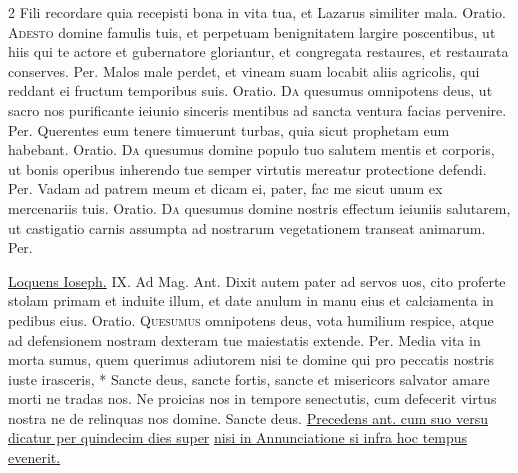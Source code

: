\begin{multicols*}{2}
 Fili recordare quia recepisti bona in vita tua, et Lazarus similiter mala. {\color{Red} Oratio.}
\lettrine[lines=2]{\zallmancaps \color{Blue} A}{desto} domine famulis tuis, et perpetuam benignitatem largire poscentibus, ut hiis qui te actore et gubernatore gloriantur, et congregata restaures, et restaurata conserves. Per.
 Malos male perdet, et vineam suam locabit aliis agricolis, qui reddant ei fructum temporibus suis. {\color{Red} Oratio.}
\lettrine[lines=2]{\zallmancaps \color{Red} D}{a} quesumus omnipotens deus, ut sacro nos purificante ieiunio sinceris mentibus ad sancta ventura facias pervenire. Per.
 Querentes eum tenere timuerunt turbas, quia sicut prophetam eum habebant. {\color{Red} Oratio.}
\lettrine[lines=2]{\zallmancaps \color{Blue} D}{a} quesumus domine populo tuo salutem mentis et corporis, ut bonis operibus inherendo tue semper virtutis mereatur protectione defendi. Per.
 Vadam ad patrem meum et dicam ei, pater, fac me sicut unum ex mercenariis tuis. {\color{Red} Oratio.}
\lettrine[lines=2]{\zallmancaps \color{Red} D}{a} quesumus domine nostris effectum ieiuniis salutarem, ut castigatio carnis assumpta ad nostrarum vegetationem transeat animarum. Per.
{\color{Red} }
\par {} \R \hyperlink{loquens-ioseph}{Loquens Ioseph.} {\color{Red} IX. Ad Mag. Ant.} Dixit autem pater ad servos uos, cito proferte stolam primam et induite illum, et date anulum in manu eius et calciamenta in pedibus eius. {\color{Red} Oratio.}
\lettrine[lines=2]{\zallmancaps \color{Blue} Q}{uesumus} omnipotens deus, vota humilium respice, atque ad defensionem nostram dexteram tue maiestatis extende. Per.
 Media vita in morta sumus, quem querimus adiutorem nisi te domine qui pro peccatis nostris iuste irasceris, * Sancte deus, sancte fortis, sancte et misericors salvator amare morti ne tradas nos. \V Ne proicias nos in tempore senectutis, cum defecerit virtus nostra ne de relinquas nos domine. Sancte deus.
\newline \ul{Precedens ant. cum suo versu dicatur per quindecim dies super}  \ul{nisi in Annunciatione si infra hoc tempus evenerit.}

\end{multicols*}
